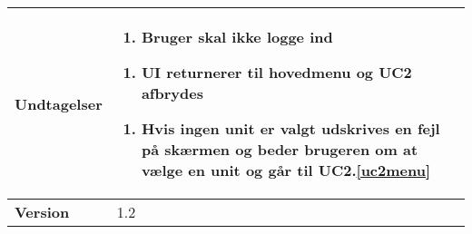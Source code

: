 \begin{table}[H]
\begin{tabular} {|p{6cm}|p{8cm}|}
		\textbf{Undtagelser}	
		
		&\begin{enumerate}[label= \ref{uc2login}a.]
			\item Bruger skal ikke logge ind
		\end{enumerate}
						
		\begin{enumerate}[label= \ref{uc2act}a.]
			\item UI returnerer til hovedmenu og UC2 afbrydes
		\end{enumerate}						
							
		\begin{enumerate}[label= \ref{uc2sysact}a.]
			\item Hvis ingen unit er valgt udskrives en fejl på skærmen og beder brugeren om at vælge en unit og går til UC2.\ref{uc2menu}
		\end{enumerate} \\\hline
											
		\textbf{Version}		&1.2 \\\hline

	\end{tabular}
	\label{UC2} 
\end{table}